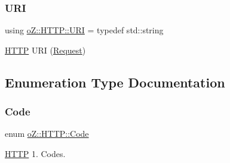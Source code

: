 \mbox{\label{namespaceo_z_1_1_h_t_t_p_a6d47156e2eac27750983fc1b54bd2ff8}} 
\subsubsection{\texorpdfstring{URI}{URI}}
{\footnotesize\ttfamily using \mbox{\hyperlink{namespaceo_z_1_1_h_t_t_p_a6d47156e2eac27750983fc1b54bd2ff8}{o\+Z\+::\+H\+T\+T\+P\+::\+U\+RI}} = typedef std\+::string}



\mbox{\hyperlink{namespaceo_z_1_1_h_t_t_p}{H\+T\+TP}} U\+RI (\mbox{\hyperlink{classo_z_1_1_h_t_t_p_1_1_request}{Request}}) 



\subsection{Enumeration Type Documentation}
\mbox{\label{namespaceo_z_1_1_h_t_t_p_acd43703151305f79b1e2f42e98ee8199}} 
\subsubsection{\texorpdfstring{Code}{Code}}
{\footnotesize\ttfamily enum \mbox{\hyperlink{namespaceo_z_1_1_h_t_t_p_acd43703151305f79b1e2f42e98ee8199}{o\+Z\+::\+H\+T\+T\+P\+::\+Code}}\hspace{0.3cm}{\ttfamily [strong]}}



\mbox{\hyperlink{namespaceo_z_1_1_h_t_t_p}{H\+T\+TP}} 1. Codes. 

